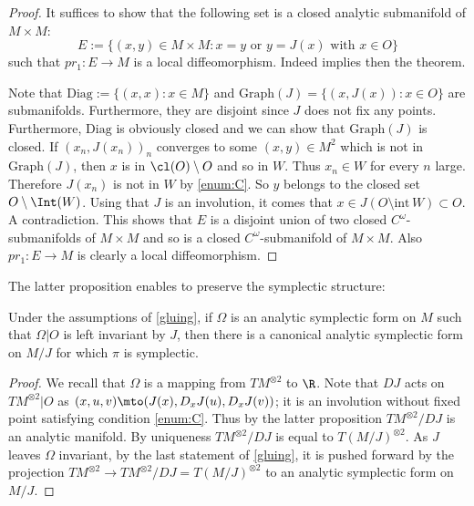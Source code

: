 \begin{proof} It suffices to show that the following set is a closed analytic submanifold of $M\times M$:
\[E:=\{(x,y)\in M\times M: x=y\text{ or } y=J(x)\text{ with } x\in O\}\]
such that $pr_1: E\to M$ is a local diffeomorphism. Indeed \cite[.5]{Bo67} implies then the theorem.

Note that $\mathrm{Diag}:=\{(x,x): x\in M\}$ and $\mathrm{Graph}(J)=\{(x,J(x)): x\in O\}$ are submanifolds. Furthermore, they are disjoint since $J$ does not fix any points. Furthermore, $\mathrm{Diag}$ is obviously closed and we can show that
$\mathrm{Graph}(J)$ is closed. If $(x_n,J(x_n))_n$ converges to some $(x,y)\in M^2$ which is not in $\mathrm{Graph}(J)$, then $x$ is in $\cl(O)\setminus O$ and so in $W$. Thus $x_n\in W$ for every $n$ large. Therefore $J(x_n)$ is not in $W$ by \eqref{enum:C}. So $y$ belongs to the closed set
$O\setminus \Int(W)$. Using that $J$ is an involution, it comes that $x\in J(O\setminus \text{int}\, W)\subset O$. A contradiction. This shows that $E$ is a disjoint union of two closed $C^\omega$-submanifolds of $M\times M$ and so is a closed $C^\omega$-submanifold of $M\times M$. Also $pr_1: E\to M$ is clearly a local diffeomorphism.
\end{proof}

The latter proposition enables to preserve the symplectic structure:
\begin{coro}\label{gluing_coro}
Under the assumptions of \cref{gluing}, if $\Omega$ is an analytic symplectic form on $M$ such that $\Omega|O $ is left invariant by $J$, then there is a canonical analytic symplectic form on $M/J$ for which $\pi$ is symplectic.
\end{coro}
\begin{proof}
We recall that $\Omega$ is a mapping from $TM^{\otimes 2}$ to $\R$. Note that $DJ$ acts on $TM^{\otimes 2}|O$ as $(x,u,v)\mto (J(x), D_xJ(u), D_xJ(v))$; it is an involution without fixed point satisfying condition \eqref{enum:C}. Thus by the latter proposition $TM^{\otimes 2}/DJ$ is an analytic manifold. By uniqueness
$TM^{\otimes 2}/DJ$ is equal to $T(M/J)^{\otimes 2}$. As $J$ leaves $\Omega$ invariant,
by the last statement of \cref{gluing},
it is pushed forward by the projection
$TM^{\otimes 2}\to TM^{\otimes 2}/DJ= T(M/J)^{\otimes 2}$ to an analytic symplectic form on $M/J$.
\end{proof}

